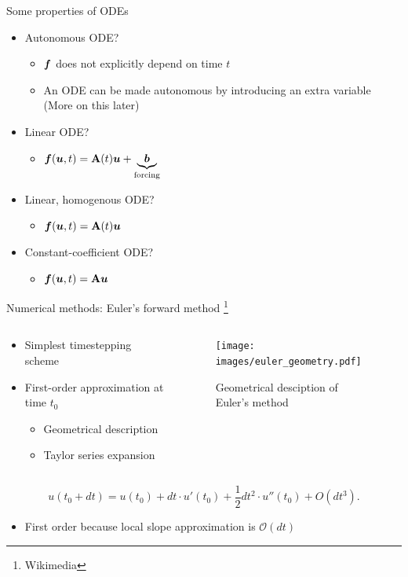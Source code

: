 \documentclass[presentation]{beamer}
\newcommand{\gv}[1]{\ensuremath{\mbox{\boldmath$ #1 $}}}
\newcommand{\bv}[1]{\ensuremath{\mathbf{#1}}}
\newcommand{\order}[1]{\mathcal O \left( #1 \right)} %
\begin{document}
\begin{frame}[label={sec:org3d14b30}]{Some properties of ODEs}
\begin{itemize}
\item \alert{Autonomous} ODE?
\begin{itemize}
\item \(\gv{f}\) does not explicitly depend on time \(t\)
\item An ODE can be made autonomous by introducing an extra variable (More on
this later)
\end{itemize}
\item \alert{Linear} ODE?
\begin{itemize}
\item \(\gv{f}(\gv{u}, t) =  \bv{A}(t)\gv{u} + \underbrace{\gv{b}}_{\text{forcing}}\)
\end{itemize}
\item \alert{Linear, homogenous} ODE?
\begin{itemize}
\item \(\gv{f}(\gv{u}, t) =  \bv{A}(t)\gv{u}\)
\end{itemize}
\item \alert{Constant-coefficient} ODE?
\begin{itemize}
\item \(\gv{f}(\gv{u}, t) =  \bv{A}\gv{u}\)
\end{itemize}
\end{itemize}
\end{frame}
\begin{frame}[label={sec:orgba45268}]{Numerical methods: Euler's forward method \footnote{Wikimedia}}
\begin{columns}
\begin{column}{0.5\columnwidth}
\begin{itemize}
\item Simplest timestepping scheme
\item First-order approximation at time \(t_0\)
\begin{itemize}
\item Geometrical description
\item Taylor series expansion
\end{itemize}
\end{itemize}
\end{column}
\begin{column}{0.4\columnwidth}
\begin{figure}[htbp]
\centering
\texttt{[image: images/euler\_geometry.pdf]}
\caption{Geometrical desciption of Euler's method}
\end{figure}
\end{column}
\end{columns}

\[ u(t_{0}+dt)=u(t_{0})+dt \cdot u'(t_{0})+{\frac {1}{2}}dt^{2} \cdot u''(t_{0})+O(dt^{3}). \]
\begin{itemize}
\item First order because local slope approximation is \(\order{dt}\)
\end{itemize}
\end{frame}
\end{document}
